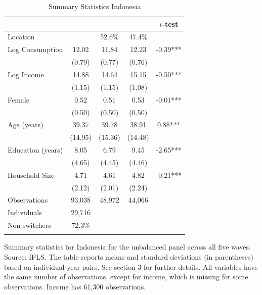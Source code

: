 \begin{table}[htbp] \centering \caption{Summary Statistics Indonesia}\label{tab:summary_stats_IDN_unb_2waves} \begin{threeparttable} \begin{tabular}{l cccc} \toprule
 &  &  &  & $t$-test \\
\midrule
Location &  &   52.6\% &   47.4\% &  \\  \addlinespace \addlinespace
Log Consumption & 12.02 & 11.84 & 12.23 & -0.39*** \\
 & (0.79) & (0.77) & (0.76) &  \\  \addlinespace
Log Income & 14.88 & 14.64 & 15.15 & -0.50*** \\
 & (1.15) & (1.15) & (1.08) &  \\  \addlinespace
Female & 0.52 & 0.51 & 0.53 & -0.01*** \\
 & (0.50) & (0.50) & (0.50) &  \\  \addlinespace
Age (years) & 39.37 & 39.78 & 38.91 & 0.88*** \\
 & (14.95) & (15.36) & (14.48) &  \\  \addlinespace
Education (years) & 8.05 & 6.79 & 9.45 & -2.65*** \\
 & (4.65) & (4.45) & (4.46) &  \\  \addlinespace
Household Size & 4.71 & 4.61 & 4.82 & -0.21*** \\
 & (2.12) & (2.01) & (2.24) &  \\  \addlinespace


\cmidrule{2-5}
Observations & 93,038 & 48,972 & 44,066 &  \\  \addlinespace
Individuals & 29,716 &  &  &  \\
Non-switchers &   72.3\% &  &  &  \\  \addlinespace
\bottomrule \end{tabular} \begin{tablenotes}[flushleft] \footnotesize \item{Summary statistics for Indonesia for the unbalanced panel across all five waves. Source: IFLS. The table reports means and standard deviations (in parentheses) based on individual-year pairs. See section 3 for further details. All variables have the same number of observations, except for income, which is missing for some observations. Income has 61,300 observations.} \end{tablenotes} \end{threeparttable} \end{table}